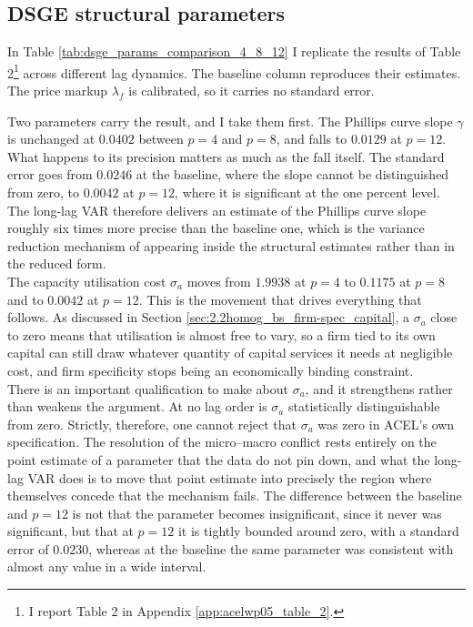 \documentclass[12pt, a4paper]{article}
\begin{document}
\subsection{DSGE structural parameters}
\label{sec:results_params}
In Table \ref{tab:dsge_params_comparison_4_8_12} I replicate the results of
\citet{ACEL2005WP} Table 2\footnote{I report \citet{ACEL2005WP} Table 2 in Appendix
\ref{app:acelwp05_table_2}.} across different lag dynamics. The baseline column reproduces
their estimates. The price markup $\lambda_f$ is calibrated, so it carries no standard error.

    {}
    {\noindent{}}
\FloatBarrier

Two parameters carry the result, and I take them first. The Phillips curve slope $\gamma$ is
unchanged at $0.0402$ between $p = 4$ and $p = 8$, and falls to $0.0129$ at $p = 12$. What
happens to its precision matters as much as the fall itself. The standard error goes from
$0.0246$ at the baseline, where the slope cannot be distinguished from zero, to $0.0042$ at
$p = 12$, where it is significant at the one percent level. The long-lag VAR therefore delivers
an estimate of the Phillips curve slope roughly six times more precise than the baseline one,
which is the variance reduction mechanism of \citet{Long_Lag2025} appearing inside the structural
estimates rather than in the reduced form.
\\

The capacity utilisation cost $\sigma_a$ moves from $1.9938$ at $p = 4$ to $0.1175$ at $p = 8$
and to $0.0042$ at $p = 12$. This is the movement that drives everything that follows. As
discussed in Section \ref{sec:2.2homog_bs_firm-spec_capital}, a $\sigma_a$ close to zero means
that utilisation is almost free to vary, so a firm tied to its own capital can still draw
whatever quantity of capital services it needs at negligible cost, and firm specificity stops
being an economically binding constraint.
\\

There is an important qualification to make about $\sigma_a$, and it strengthens rather than
weakens the argument. At no lag order is $\sigma_a$ statistically distinguishable from zero.
Strictly, therefore, one cannot reject that $\sigma_a$ was zero in ACEL's own specification. The
resolution of the micro--macro conflict rests entirely on the point estimate of a parameter that
the data do not pin down, and what the long-lag VAR does is to move that point estimate into
precisely the region where \citet{ACEL2011} themselves concede that the mechanism fails. The
difference between the baseline and $p = 12$ is not that the parameter becomes insignificant,
since it never was significant, but that at $p = 12$ it is tightly bounded around zero, with a
standard error of $0.0230$, whereas at the baseline the same parameter was consistent with
almost any value in a wide interval.
\\
\end{document}
